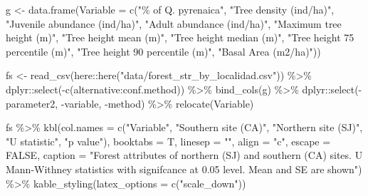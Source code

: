 \documentclass[
]{article}
\newenvironment{Shaded}{\begin{snugshade}}{\end{snugshade}}
\newcommand{\AttributeTok}[1]{\textcolor[rgb]{0.77,0.63,0.00}{#1}}
\newcommand{\ConstantTok}[1]{\textcolor[rgb]{0.00,0.00,0.00}{#1}}
\newcommand{\FunctionTok}[1]{\textcolor[rgb]{0.00,0.00,0.00}{#1}}
\newcommand{\NormalTok}[1]{#1}
\newcommand{\OtherTok}[1]{\textcolor[rgb]{0.56,0.35,0.01}{#1}}
\newcommand{\SpecialCharTok}[1]{\textcolor[rgb]{0.00,0.00,0.00}{#1}}
\newcommand{\StringTok}[1]{\textcolor[rgb]{0.31,0.60,0.02}{#1}}
\begin{document}
\begin{Shaded}
\begin{Highlighting}[]
\NormalTok{g }\OtherTok{\textless{}{-}} \FunctionTok{data.frame}\NormalTok{(}\AttributeTok{Variable =} \FunctionTok{c}\NormalTok{(}\StringTok{"\% of Q. pyrenaica"}\NormalTok{, }\StringTok{"Tree density (ind/ha)"}\NormalTok{, }\StringTok{"Juvenile abundance (ind/ha)"}\NormalTok{, }\StringTok{"Adult abundance (ind/ha)"}\NormalTok{, }
\StringTok{"Maximum tree height (m)"}\NormalTok{, }\StringTok{"Tree height mean (m)"}\NormalTok{,  }\StringTok{"Tree height median (m)"}\NormalTok{,  }\StringTok{"Tree height 75 percentile (m)"}\NormalTok{, }\StringTok{"Tree height 90 percentile (m)"}\NormalTok{, }\StringTok{"Basal Area (m2/ha)"}\NormalTok{))}

\NormalTok{fs }\OtherTok{\textless{}{-}} \FunctionTok{read\_csv}\NormalTok{(here}\SpecialCharTok{::}\FunctionTok{here}\NormalTok{(}\StringTok{"data/forest\_str\_by\_localidad.csv"}\NormalTok{)) }\SpecialCharTok{\%\textgreater{}\%} 
\NormalTok{  dplyr}\SpecialCharTok{::}\FunctionTok{select}\NormalTok{(}\SpecialCharTok{{-}}\FunctionTok{c}\NormalTok{(alternative}\SpecialCharTok{:}\NormalTok{conf.method)) }\SpecialCharTok{\%\textgreater{}\%} 
  \FunctionTok{bind\_cols}\NormalTok{(g) }\SpecialCharTok{\%\textgreater{}\%} 
\NormalTok{  dplyr}\SpecialCharTok{::}\FunctionTok{select}\NormalTok{(}\SpecialCharTok{{-}}\NormalTok{parameter2, }\SpecialCharTok{{-}}\NormalTok{variable, }\SpecialCharTok{{-}}\NormalTok{method) }\SpecialCharTok{\%\textgreater{}\%} 
  \FunctionTok{relocate}\NormalTok{(Variable) }

\NormalTok{fs }\SpecialCharTok{\%\textgreater{}\%} 
  \FunctionTok{kbl}\NormalTok{(}\AttributeTok{col.names =} \FunctionTok{c}\NormalTok{(}\StringTok{"Variable"}\NormalTok{,}
                    \StringTok{"Southern site (CA)"}\NormalTok{,}
                    \StringTok{"Northern site (SJ)"}\NormalTok{,}
                    \StringTok{"U statistic"}\NormalTok{,}
                    \StringTok{"p value"}\NormalTok{), }
       \AttributeTok{booktabs =}\NormalTok{ T, }\AttributeTok{linesep =} \StringTok{""}\NormalTok{, }
      \AttributeTok{align =} \StringTok{"c"}\NormalTok{, }\AttributeTok{escape =} \ConstantTok{FALSE}\NormalTok{, }
      \AttributeTok{caption =} \StringTok{"Forest attributes of northern (SJ) and southern (CA) sites. U Mann{-}Withney statistics with signifcance at 0.05 level. Mean and SE are shown"}\NormalTok{) }\SpecialCharTok{\%\textgreater{}\%} 
  \FunctionTok{kable\_styling}\NormalTok{(}\AttributeTok{latex\_options =} \FunctionTok{c}\NormalTok{(}\StringTok{"scale\_down"}\NormalTok{)) }
\end{Highlighting}
\end{Shaded}
\end{document}
